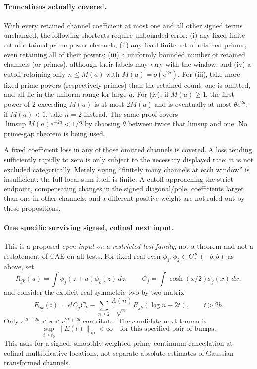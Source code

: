 \documentclass[11pt]{article}
\theoremstyle{remark}
\begin{document}
\paragraph{Truncations actually covered.}
With every retained channel coefficient at most one and all other
signed terms unchanged, the following shortcuts require unbounded error:
(i) any fixed finite set of retained prime-power channels; (ii) any
fixed finite set of retained primes, even retaining all of their powers;
(iii) a uniformly bounded number of retained channels (or primes),
although their labels may vary with the window; and (iv) a cutoff
retaining only $n\le M(a)$ with $M(a)=o(e^{2a})$.
For (iii), take more fixed prime powers (respectively primes) than the
retained count: one is omitted, and all lie in the uniform range for
large $a$. For (iv), if $M(a)\ge1$, the first power of $2$ exceeding
$M(a)$ is at most $2M(a)$ and is eventually at most $\theta e^{2a}$;
if $M(a)<1$, take $n=2$ instead. The same proof covers
$\limsup M(a)e^{-2a}<1/2$ by choosing $\theta$ between twice that
limsup and one. No prime-gap theorem is being used.

A fixed coefficient loss in any of those omitted channels is covered.
A loss tending sufficiently rapidly to zero is only subject to the
necessary displayed rate; it is not excluded categorically. Merely
saying ``finitely many channels at each window'' is insufficient:
the full local sum itself is finite. A cutoff approaching the strict
endpoint, compensating changes in the signed diagonal/pole, coefficients
larger than one in other channels, and a different positive weight are
not ruled out by these propositions.

\paragraph{One specific surviving signed, cofinal next input.}
This is a proposed \emph{open input on a restricted test family}, not
a theorem and not a restatement of CAE on all tests. For fixed real even
$\phi_1,\phi_2\in C_c^\infty(-b,b)$ as above, set
\[
 R_{jk}(u)=\int\phi_j(z+u)\phi_k(z)\,dz,\qquad
 C_j=\int\cosh(x/2)\phi_j(x)\,dx,
\]
and consider the explicit real symmetric two-by-two matrix
\[
 E_{jk}(t)=e^t C_jC_k-
       \sum_{n\ge2}\frac{\Lambda(n)}{\sqrt n}
                          R_{jk}(\log n-2t),\qquad t>2b.
\]
Only $e^{2t-2b}<n<e^{2t+2b}$ contribute. The candidate next lemma is
\[
 \sup_{t\ge t_0}\|E(t)\|_{\mathrm{op}}<\infty
 \quad\text{for this specified pair of bumps.}
\]
This asks for a signed, smoothly weighted prime--continuum cancellation
at cofinal multiplicative locations, not separate absolute estimates
of Gaussian transformed channels.
\end{document}
